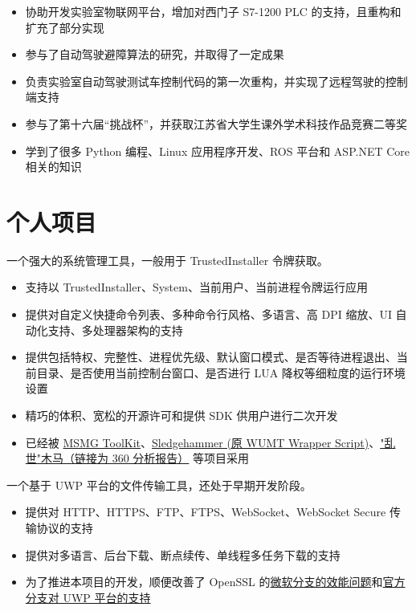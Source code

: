 \documentclass{resume}
\begin{document}
\begin{itemize}
  \item 协助开发实验室物联网平台，增加对西门子 S7-1200 PLC 的支持，且重构和扩充了部分实现
  \item 参与了自动驾驶避障算法的研究，并取得了一定成果
  \item 负责实验室自动驾驶测试车控制代码的第一次重构，并实现了远程驾驶的控制端支持
  \item 参与了第十六届“挑战杯”，并获取江苏省大学生课外学术科技作品竞赛二等奖
  \item 学到了很多 Python 编程、Linux 应用程序开发、ROS 平台和 ASP.NET Core 相关的知识
\end{itemize}

\section{个人项目}

一个强大的系统管理工具，一般用于 TrustedInstaller 令牌获取。
\begin{itemize}
  \item 支持以 TrustedInstaller、System、当前用户、当前进程令牌运行应用
  \item 提供对自定义快捷命令列表、多种命令行风格、多语言、高 DPI 缩放、UI 自动化支持、多处理器架构的支持
  \item 提供包括特权、完整性、进程优先级、默认窗口模式、是否等待进程退出、当前目录、是否使用当前控制台窗口、是否进行 LUA 降权等细粒度的运行环境设置
  \item 精巧的体积、宽松的开源许可和提供 SDK 供用户进行二次开发
  \item 已经被 \href{https://forums.mydigitallife.net/threads/50572/}{MSMG ToolKit}、\href{https://forums.mydigitallife.net/threads/72203/}{Sledgehammer (原 WUMT Wrapper Script)}、\href{http://www.360.cn/n/10477.html}{"乱世"木马（链接为 360 分析报告）} 等项目采用
\end{itemize}

一个基于 UWP 平台的文件传输工具，还处于早期开发阶段。
\begin{itemize}
  \item 提供对 HTTP、HTTPS、FTP、FTPS、WebSocket、WebSocket Secure 传输协议的支持
  \item 提供对多语言、后台下载、断点续传、单线程多任务下载的支持
  \item 为了推进本项目的开发，顺便改善了 OpenSSL 的\href{https://github.com/microsoft/openssl/pull/61}{微软分支的效能问题}和\href{https://github.com/openssl/openssl/blob/42b3f10b5e461496aab1f74d24103d6902ebfcd5/CHANGES#L350}{官方分支对 UWP 平台的支持}
\end{itemize}
\end{document}
